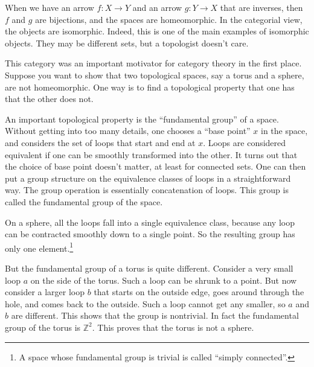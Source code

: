 \documentclass{article}
\def\R{{\mathbb R}}
\begin{document}
When we have an arrow $f : X\to Y$ and an arrow $g : Y\to X$ that are
inverses, then $f$ and $g$ are bijections, and the spaces are
homeomorphic.  In the categorial view, the objects are isomorphic.
Indeed, this is one of the main examples of isomorphic objects.  They
may be different sets, but a topologist doesn't care.  


This category was an important motivator for category theory in the
first place.  Suppose you want to show that two topological spaces,
say a torus and a sphere, are not homeomorphic.  One way is to find a
topological property that one has that the other does not.  

An important topological property is the ``fundamental group'' of a
space.  Without getting into too many details, one chooses a ``base
point'' $x$ in the space, and considers the set of loops that start
and end at $x$. Loops are considered equivalent if one can be smoothly
transformed into the other.  It turns out that the choice of base
point doesn't matter, at least for connected sets.  One can then put a
group structure on the equivalence classes of loops in a
straightforward way.  The group operation is essentially concatenation
of loops.  This group is called the fundamental group of the space.

On a sphere, all the loops fall into a single equivalence class,
because any loop can be contracted smoothly down to a single point.
So the resulting group has only one element.\footnote{A space whose
  fundamental group is trivial is called ``simply connected''.}

But the fundamental group of a torus is quite different.  Consider a
very small loop $a$ on the side of the torus.  Such a loop can be
shrunk to a point.  But now consider a larger loop $b$ that starts on
the outside edge, goes around through the hole, and comes back to the
outside. Such a loop cannot get any smaller, so $a$ and $b$ are
different.  This shows that the group is nontrivial.  In fact the
fundamental group of the torus is $\mathbb Z^2$.  This proves that
the torus is not a sphere.
\end{document}
